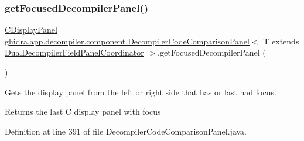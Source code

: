 \subsubsection{\texorpdfstring{getFocusedDecompilerPanel()}{getFocusedDecompilerPanel()}}
{\footnotesize\ttfamily \mbox{\hyperlink{classghidra_1_1app_1_1decompiler_1_1component_1_1_c_display_panel}{C\+Display\+Panel}} \mbox{\hyperlink{classghidra_1_1app_1_1decompiler_1_1component_1_1_decompiler_code_comparison_panel}{ghidra.\+app.\+decompiler.\+component.\+Decompiler\+Code\+Comparison\+Panel}}$<$ T extends \mbox{\hyperlink{classghidra_1_1app_1_1decompiler_1_1component_1_1_dual_decompiler_field_panel_coordinator}{Dual\+Decompiler\+Field\+Panel\+Coordinator}} $>$.get\+Focused\+Decompiler\+Panel (\begin{DoxyParamCaption}{ }\end{DoxyParamCaption})\hspace{0.3cm}{\ttfamily [inline]}}

Gets the display panel from the left or right side that has or last had focus. \begin{DoxyReturn}{Returns}
the last C display panel with focus 
\end{DoxyReturn}


Definition at line 391 of file Decompiler\+Code\+Comparison\+Panel.\+java.

